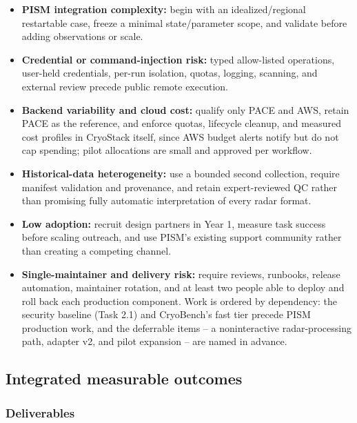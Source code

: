 \begin{itemize}[leftmargin=*]
  \item \textbf{PISM integration complexity:} begin with an idealized/regional
  restartable case, freeze a minimal state/parameter scope, and validate before
  adding observations or scale.
  \item \textbf{Credential or command-injection risk:} typed allow-listed
  operations, user-held credentials, per-run isolation, quotas, logging,
  scanning, and external review precede public remote execution.
  \item \textbf{Backend variability and cloud cost:} qualify only PACE and AWS,
  retain PACE as the reference, and enforce quotas, lifecycle cleanup, and
  measured cost profiles in CryoStack itself, since AWS budget alerts notify
  but do not cap spending; pilot allocations are small and approved per
  workflow.
  \item \textbf{Historical-data heterogeneity:} use a bounded second collection,
  require manifest validation and provenance, and retain expert-reviewed QC
  rather than promising fully automatic interpretation of every radar format.
  \item \textbf{Low adoption:} recruit design partners in Year 1, measure task
  success before scaling outreach, and use PISM's existing support community
  rather than creating a competing channel.
  \item \textbf{Single-maintainer and delivery risk:} require reviews,
  runbooks, release automation, maintainer rotation, and at least two people
  able to deploy and roll back each production component. Work is ordered by
  dependency: the security baseline (Task 2.1) and CryoBench's fast tier
  precede PISM production work, and the deferrable items -- a noninteractive
  radar-processing path, adapter v2, and pilot expansion -- are named in advance.
\end{itemize}

\subsection{Integrated measurable outcomes}

\subsubsection{Deliverables}

